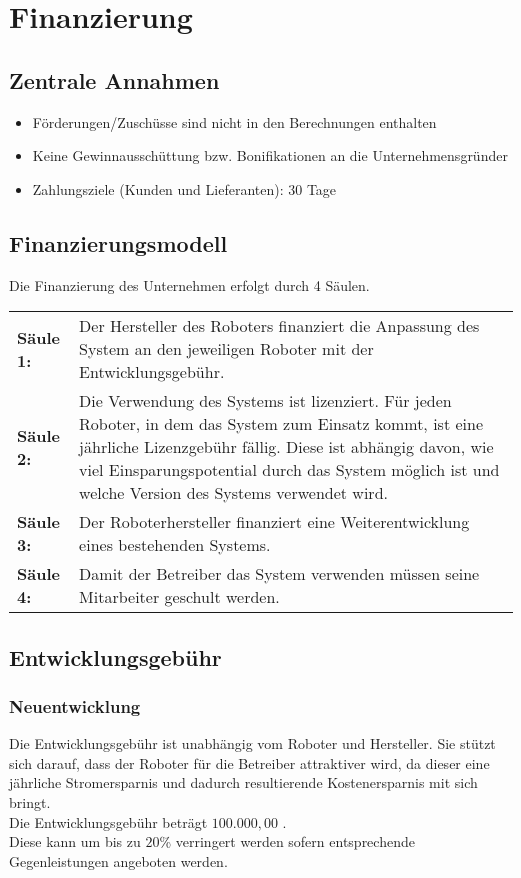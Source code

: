 \chapter{Finanzierung}
\section{Zentrale Annahmen}
\begin{itemize}
	\item Förderungen/Zuschüsse sind nicht in den Berechnungen enthalten
	\item Keine Gewinnausschüttung bzw. Bonifikationen an die Unternehmensgründer
	\item Zahlungsziele (Kunden und Lieferanten): 30 Tage
\end{itemize}

\section{Finanzierungsmodell}
Die Finanzierung des Unternehmen erfolgt durch 4 Säulen. 

\noindent
\begin{tabular}{@{}>{\raggedright\arraybackslash}p{1.8cm}@{}>{\raggedright\arraybackslash}p{\textwidth - 1.8cm}}
 
	\textbf{Säule 1:} & Der Hersteller des Roboters finanziert die Anpassung des System an den jeweiligen Roboter mit der Entwicklungsgebühr. \\ 

	\textbf{Säule 2:} & Die Verwendung des Systems ist lizenziert. Für jeden Roboter, in dem das System zum Einsatz kommt, ist eine jährliche Lizenzgebühr fällig. Diese ist abhängig davon, wie viel Einsparungspotential durch das System möglich ist und welche Version des Systems verwendet wird. \\
	
	\textbf{Säule 3:} & Der Roboterhersteller finanziert eine Weiterentwicklung eines bestehenden Systems. \\
	
	\textbf{Säule 4:} & Damit der Betreiber das System verwenden müssen seine Mitarbeiter geschult werden.
\end{tabular}

\section{Entwicklungsgebühr}
\subsection{Neuentwicklung}
Die Entwicklungsgebühr ist unabhängig vom Roboter und Hersteller. Sie stützt sich darauf, dass der Roboter für die Betreiber attraktiver wird, da dieser eine jährliche Stromersparnis und dadurch resultierende Kostenersparnis mit sich bringt.\\
Die Entwicklungsgebühr beträgt $100.000,00$ \officialeuro.\\
Diese kann um bis zu $20$\% verringert werden sofern entsprechende Gegenleistungen angeboten werden.

